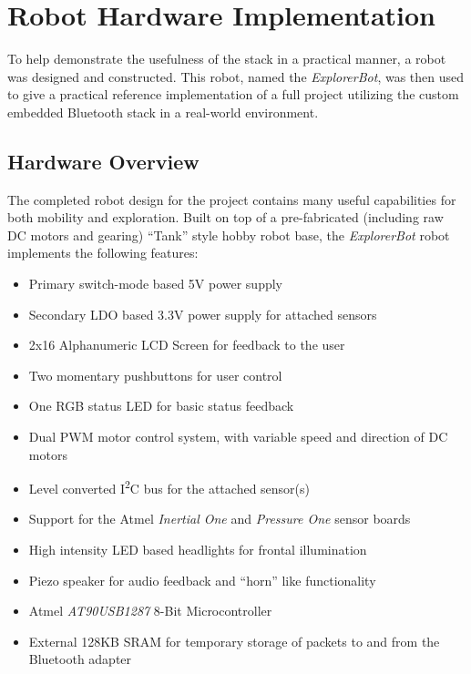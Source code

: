 \chapter{Robot Hardware Implementation}
\label{chp:robothwimp}

To help demonstrate the usefulness of the stack in a practical manner, a robot was designed and constructed. This robot, named the \emph{ExplorerBot}, was then used to give a practical reference implementation of a full project utilizing the custom embedded Bluetooth stack in a real-world environment.

\section{Hardware Overview}

The completed robot design for the project contains many useful capabilities for both mobility and exploration. Built on top of a pre-fabricated (including raw DC motors and gearing) ``Tank'' style hobby robot base, the \emph{ExplorerBot} robot implements the following features:

\begin{itemize}
	\item Primary switch-mode based 5V power supply
	\item Secondary LDO based 3.3V power supply for attached sensors
	\item 2x16 Alphanumeric LCD Screen for feedback to the user
	\item Two momentary pushbuttons for user control
	\item One RGB status LED for basic status feedback
	\item Dual PWM motor control system, with variable speed and direction of DC motors
	\item Level converted I\textsuperscript{2}C bus for the attached sensor(s)
	\item Support for the Atmel \textit{Inertial One} and \textit{Pressure One} sensor boards
	\item High intensity LED based headlights for frontal illumination
	\item Piezo speaker for audio feedback and ``horn'' like functionality
	\item Atmel \textit{AT90USB1287} 8-Bit Microcontroller
	\item External 128KB SRAM for temporary storage of packets to and from the Bluetooth adapter
\end{itemize}

